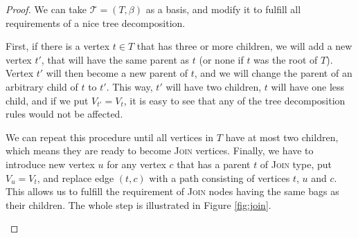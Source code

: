\documentclass[thesis=M,english,hidelinks]{FITthesis}[2012/10/20]
\theoremstyle{definition}
\begin{document}
\begin{proof}
    We can take $\mathcal{T} = (T, \beta)$ as a basis, and modify it to fulfill all requirements of a nice tree
    decomposition.

    First, if there is a vertex $t \in T$ that has three or more children, we will add a new vertex $t'$, that will have
    the same parent as $t$ (or none if $t$ was the root of $T$). Vertex $t'$ will then become a new parent of $t$, and
    we will change the parent of an arbitrary child of $t$ to $t'$. This way, $t'$ will have two children, $t$ will have
    one less child, and if we put $V_{t'} =V_t$, it is easy to see that any of the tree decomposition rules would not be
    affected.

    We can repeat this procedure until all vertices in $T$ have at most two children, which means they are ready to
    become \textsc{Join} vertices. Finally, we have to introduce new vertex $u$ for any vertex $c$ that has a
    parent $t$ of \textsc{Join} type, put $V_u = V_t$, and replace edge $(t, c)$ with a path consisting of
    vertices $t$, $u$ and $c$. This allows us to fulfill the requirement of \textsc{Join} nodes having the same bags as
    their children. The whole step is illustrated in Figure \ref{fig:join}.

    \begin{figure}[H]
        \centering
\end{figure}
\end{proof}
\end{document}

